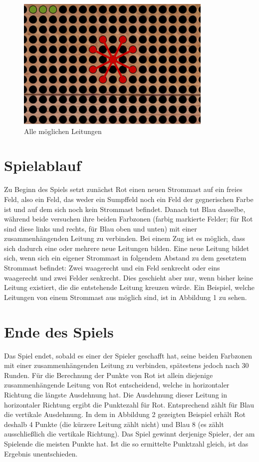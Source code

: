 \documentclass[a4paper, ngerman]{scrartcl}
\begin{document}
\begin{figure}[h!]
		\centering
		\includegraphics[scale = 0.8]{bilder/setzzug.png}
		\caption{Alle möglichen Leitungen}
		\label{fig:Leitungen}
\end{figure}
	
\section{Spielablauf}	 
Zu Beginn des Spiels setzt zunächst Rot einen neuen Strommast auf ein
freies Feld, also ein Feld, das weder ein Sumpffeld noch ein Feld der
gegnerischen Farbe ist und auf dem sich noch kein Strommast befindet. 
Danach tut Blau dasselbe, während beide versuchen
ihre beiden Farbzonen (farbig markierte Felder; für Rot sind diese links und
rechts, für Blau  oben und unten) mit einer zusammenhängenden Leitung zu
verbinden.
Bei einem Zug ist es möglich, dass sich dadurch eine oder mehrere
neue Leitungen bilden. Eine neue Leitung bildet sich, wenn sich ein eigener
Strommast in folgendem Abstand zu dem gesetztem Strommast befindet: Zwei
waagerecht und ein Feld senkrecht oder eins waagerecht und zwei Felder
senkrecht. Dies geschieht aber nur, wenn bisher keine Leitung existiert, die
die entstehende Leitung kreuzen würde.
Ein Beispiel, welche Leitungen von einem Strommast aus möglich sind, ist
in Abbildung 1 zu sehen.
	 
	
\section{Ende des Spiels} 
Das Spiel endet, sobald es einer der Spieler geschafft hat, seine beiden
Farbzonen mit einer zusammenhängenden Leitung zu verbinden, spätestens jedoch
nach 30 Runden.
Für die Berechnung der Punkte von Rot ist allein diejenige zusammenhängende
Leitung von Rot entscheidend, welche in horizontaler Richtung die längste Ausdehnung
hat. Die Ausdehnung dieser Leitung in horizontaler Richtung ergibt die Punktezahl
für Rot. Entsprechend zählt für Blau die vertikale Ausdehnung.
In dem in Abbildung 2 gezeigten Beispiel erhält Rot deshalb 4 Punkte
(die kürzere Leitung zählt nicht) und Blau 8 (es zählt ausschließlich
die vertikale Richtung). Das Spiel gewinnt derjenige Spieler, der am Spielende die
meisten Punkte hat.
Ist die so ermittelte Punktzahl gleich, ist das Ergebnis unentschieden.
\end{document}
